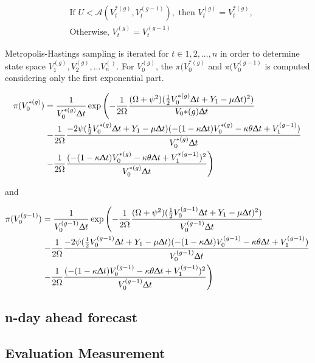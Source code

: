 \documentclass[12pt,a4paper]{article}
\numberwithin{equation}{section}
\begin{document}
\begin{align*}
&\text{If } U< \mathcal{A}(V_t^{*(g)}, V_t^{(g-1)}), \text{ then } V_t^{(g)} = V_t^{*(g)},\\
&\text{Otherwise, }  V_t^{(g)} = V_t^{(g-1)}
\end{align*} 

Metropolis-Hastings sampling is iterated for $t \in {1, 2, ..., n}$ in order to determine state space $V_1^{(g)}, V_2^{(g)}, ...V_n^{()}$. For $V_0^{(g)}$, the $\pi(V_0^{*(g)}$ and $\pi(V_0^{(g-1)}$ is computed considering only the first exponential part. 

\begin{align*}
\pi(V_0^{*(g)}) &= \frac{1}{V_0^{*(g)} \Updelta t} \exp \left( -\frac{1}{2 \Omega} \frac{(\Omega + \psi^2)(\frac{1}{2} V_0^{*(g)} \Updelta t + Y_{1} - \mu \Updelta t)^2)}{V_0{*(g)} \Updelta t} \right.\\
& \left. -\frac{1}{2\Omega}\frac{-2\psi (\frac{1}{2}V_0^{*(g)} \Updelta t + Y_{1} - \mu \Updelta t)(-(1-\kappa\Updelta t) V_0^{*(g)} -\kappa \theta \Updelta t + V_{1}^{(g-1)})}{V_0^{*(g)} \Updelta t} \right.\\
& \left. -\frac{1}{2\Omega}\frac{(-(1-\kappa \Updelta t) V_0^{*(g)} -\kappa \theta \Updelta t + V_{1}^{*(g-1)})^2}{V_0^{*(g)} \Updelta t} \right)
\end{align*}

and 

\begin{align*}
\pi(V_0^{(g-1)}) &= \frac{1}{V_0^{(g-1)} \Updelta t} \exp \left( -\frac{1}{2 \Omega} \frac{(\Omega + \psi^2)(\frac{1}{2} V_0^{(g-1)} \Updelta t + Y_{1} - \mu \Updelta t)^2)}{V_0^{(g-1)} \Updelta t} \right.\\
& \left. -\frac{1}{2\Omega}\frac{-2\psi (\frac{1}{2}V_0^{(g-1)} \Updelta t + Y_{1} - \mu \Updelta t)(-(1-\kappa\Updelta t) V_0^{(g-1)} -\kappa \theta \Updelta t + V_{1}^{(g-1)})}{V_0^{(g-1)} \Updelta t} \right.\\
& \left. -\frac{1}{2\Omega}\frac{(-(1-\kappa \Updelta t) V_0^{(g-1)} -\kappa \theta \Updelta t + V_{1}^{(g-1)})^2}{V_0^{(g-1)} \Updelta t} \right)
\end{align*}


\subsection{n-day ahead forecast}


\subsection{Evaluation Measurement}
\end{document}
